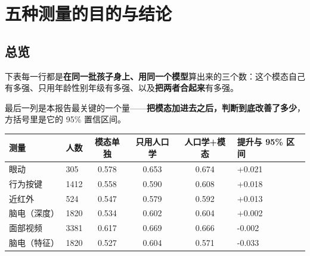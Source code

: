 \documentclass[UTF8,12pt,a4paper]{ctexart}
\newcommand{\key}[1]{\textbf{\textcolor{blue!45!black}{#1}}}
\begin{document}
\section{五种测量的目的与结论}

\subsection{总览}

下表每一行都是\key{在同一批孩子身上、用同一个模型}算出来的三个数：这个模态自己有多强、只用年龄性别年级有多强、以及\key{把两者合起来}有多强。

最后一列是本报告最关键的一个量——\key{把模态加进去之后，判断到底改善了多少}，方括号里是它的 95\% 置信区间。

\vspace{0.4em}
\begin{center}
{\small\setlength{\tabcolsep}{4pt}
\begin{tabular}{@{}llcccl@{}}
\toprule
\textbf{测量} & \textbf{人数} & \textbf{模态单独} & \textbf{只用人口学} & \textbf{人口学+模态} & \textbf{提升与 95\% 区间} \\
\midrule
眼动 & 305 & 0.578 & 0.653 & 0.674 & +0.021\quad[-0.048, +0.089] \\
行为按键 & 1412 & 0.558 & 0.590 & 0.608 & +0.018\quad[-0.005, +0.040] \\
近红外 & 524 & 0.547 & 0.579 & 0.592 & +0.013\quad[-0.041, +0.067] \\
脑电（深度） & 1820 & 0.534 & 0.602 & 0.604 & +0.002\quad[-0.006, +0.008] \\
面部视频 & 3381 & 0.617 & 0.669 & 0.666 & -0.002\quad[-0.017, +0.011] \\
脑电（特征） & 1820 & 0.527 & 0.604 & 0.571 & -0.033\quad[-0.059, -0.006] \\
\bottomrule
\end{tabular}}
\end{center}
\end{document}
